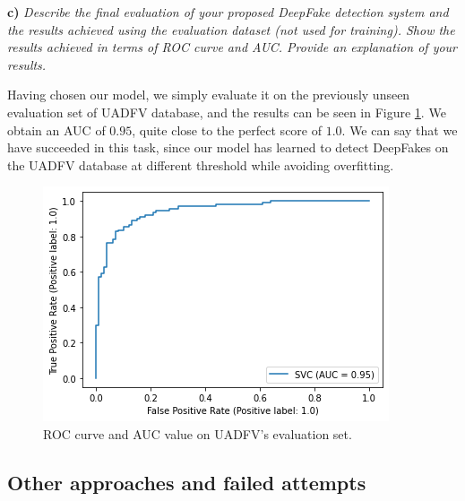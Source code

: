 \documentclass[11pt]{article}
\begin{document}
\textbf{c)} \textit{Describe the final evaluation of your proposed DeepFake detection system and the results achieved using the evaluation dataset (not used for training). Show the results achieved in terms of ROC curve and AUC. Provide an explanation of your results.}

Having chosen our model, we simply evaluate it on the previously unseen evaluation set of UADFV database, and the results can be seen in Figure \ref{fig:t1-roc-test}. We obtain an AUC of $0.95$, quite close to the perfect score of $1.0$. We can say that we have succeeded in this task, since our model has learned to detect DeepFakes on the UADFV database at different threshold while avoiding overfitting.

\begin{figure}[h!]
  \centering
  \includegraphics[width=.6\textwidth]{img/1-roc-UADFV}
  \caption{ROC curve and AUC value on UADFV's evaluation set.}
  \label{fig:t1-roc-test}
\end{figure}

\subsection*{Other approaches and failed attempts}
\end{document}

